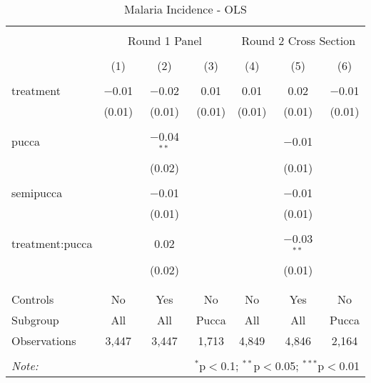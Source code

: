 
\begin{table}[!htbp] \centering 
  \caption{Malaria Incidence - OLS} 
  \label{tbl:Malaria Incidence - OLS} 
\begin{tabular}{@{\extracolsep{5pt}}lcccccc} 
\\[-1.8ex]\hline 
\hline \\[-1.8ex] 
 & \multicolumn{3}{c}{Round 1 Panel} & \multicolumn{3}{c}{Round 2 Cross Section} \\ 
\\[-1.8ex] & (1) & (2) & (3) & (4) & (5) & (6)\\ 
\hline \\[-1.8ex] 
 treatment & $-$0.01 & $-$0.02 & 0.01 & 0.01 & 0.02 & $-$0.01 \\ 
  & (0.01) & (0.01) & (0.01) & (0.01) & (0.01) & (0.01) \\ 
  & & & & & & \\ 
 pucca &  & $-$0.04$^{**}$ &  &  & $-$0.01 &  \\ 
  &  & (0.02) &  &  & (0.01) &  \\ 
  & & & & & & \\ 
 semipucca &  & $-$0.01 &  &  & $-$0.01 &  \\ 
  &  & (0.01) &  &  & (0.01) &  \\ 
  & & & & & & \\ 
 treatment:pucca &  & 0.02 &  &  & $-$0.03$^{**}$ &  \\ 
  &  & (0.02) &  &  & (0.01) &  \\ 
  & & & & & & \\ 
\hline \\[-1.8ex] 
Controls & No & Yes & No & No & Yes & No \\ 
Subgroup & All & All & Pucca & All & All & Pucca \\ 
Observations & 3,447 & 3,447 & 1,713 & 4,849 & 4,846 & 2,164 \\ 
\hline 
\hline \\[-1.8ex] 
\textit{Note:}  & \multicolumn{6}{r}{$^{*}$p$<$0.1; $^{**}$p$<$0.05; $^{***}$p$<$0.01} \\ 
\end{tabular} 
\end{table} 
